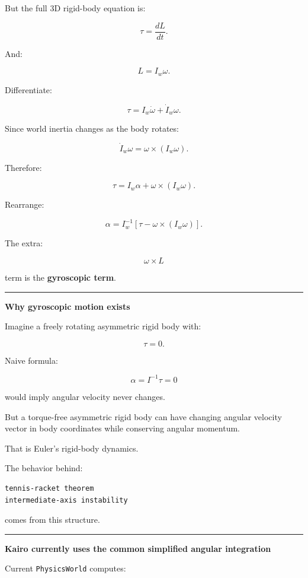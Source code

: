 But the full 3D rigid-body equation is:

\[
\boxed{
\tau
=
\frac{dL}{dt}.
}
\]

And:

\[
L=I_w\omega.
\]

Differentiate:

\[
\tau
=
I_w\dot\omega
+
\dot I_w\omega.
\]

Since world inertia changes as the body rotates:

\[
\dot I_w\omega
=
\omega\times(I_w\omega).
\]

Therefore:

\[
\boxed{
\tau
=
I_w\alpha
+
\omega\times(I_w\omega).
}
\]

Rearrange:

\[
\boxed{
\alpha
=
I_w^{-1}
\left[
\tau
-
\omega\times(I_w\omega)
\right].
}
\]

The extra:

\[
\omega\times L
\]

term is the \textbf{gyroscopic term}.

\begin{center}\rule{0.5\linewidth}{0.5pt}\end{center}

\textbf{Why gyroscopic motion exists}

Imagine a freely rotating asymmetric rigid body with:

\[
\tau=0.
\]

Naive formula:

\[
\alpha=I^{-1}\tau=0
\]

would imply angular velocity never changes.

But a torque-free asymmetric rigid body can have changing angular velocity vector in body coordinates while conserving angular momentum.

That is Euler's rigid-body dynamics.

The behavior behind:

\begin{verbatim}
tennis-racket theorem
intermediate-axis instability
\end{verbatim}

comes from this structure.

\begin{center}\rule{0.5\linewidth}{0.5pt}\end{center}

\textbf{Kairo currently uses the common simplified angular integration}

Current \texttt{PhysicsWorld} computes:

